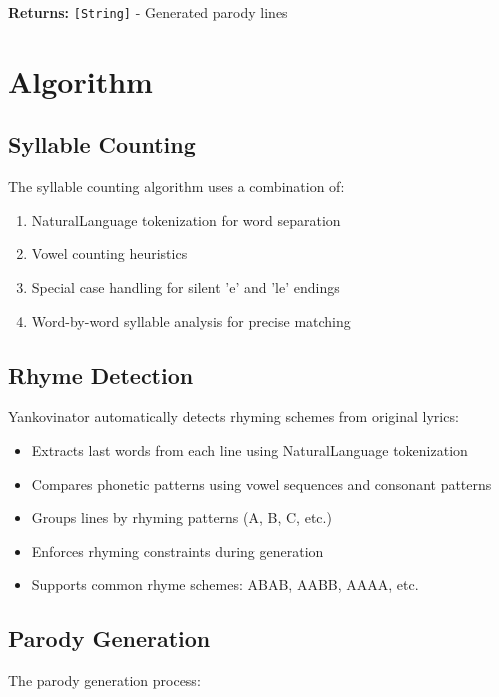 \documentclass[11pt,a4paper]{article}
\begin{document}
\textbf{Returns:} \texttt{[String]} - Generated parody lines

\section{Algorithm}

\subsection{Syllable Counting}

The syllable counting algorithm uses a combination of:

\begin{enumerate}
    \item NaturalLanguage tokenization for word separation
    \item Vowel counting heuristics
    \item Special case handling for silent 'e' and 'le' endings
    \item Word-by-word syllable analysis for precise matching
\end{enumerate}

\subsection{Rhyme Detection}

Yankovinator automatically detects rhyming schemes from original lyrics:

\begin{itemize}
    \item Extracts last words from each line using NaturalLanguage tokenization
    \item Compares phonetic patterns using vowel sequences and consonant patterns
    \item Groups lines by rhyming patterns (A, B, C, etc.)
    \item Enforces rhyming constraints during generation
    \item Supports common rhyme schemes: ABAB, AABB, AAAA, etc.
\end{itemize}

\subsection{Parody Generation}

The parody generation process:
\end{document}
